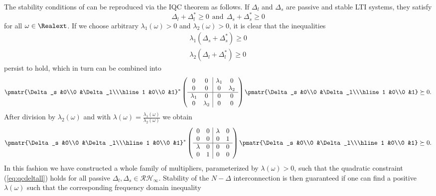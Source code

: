 The stability conditions of  can be reproduced via the IQC theorem as follows. If $\Delta_l$ and $\Delta_s$ are passive and stable LTI systems, they satisfy
\[
\Delta_l + \Delta_l^* \geq 0 \ \ \text{and}\ \
\Delta_s + \Delta_s^* \geq 0
\]
for all $\omega\in\Realext$. If we choose arbitrary $\lambda_1(\omega)>0$ and $\lambda_2(\omega)>0$, it is clear that
the inequalities
\begin{align*}
\lambda_1(\Delta_s + \Delta_s^*) \geq 0 \\
\lambda_2(\Delta_l + \Delta_l^*) \geq 0
\end{align*}
persist to hold, which in turn can be combined into
\[%
\pmatr{\Delta_s &0\\0 &\Delta_l\\\hline 1 &0\\0 &1}^*\left(\begin{array}{cc|cc}
      0&0  &\lambda_1 &0 \\
      0&0  &0         &\lambda_2\\ \hline
      \lambda_1 &0 &0 &0\\
      0 &\lambda_2 &0 &0
\end{array}\right)
\pmatr{\Delta_s &0\\0 &\Delta_l\\\hline 1 &0\\0 &1}
\succeq 0.
\]
After division by $\lambda_2(\omega)$ and with
$\lambda(\omega)=\frac{\lambda_1(\omega)}{\lambda_2(\omega)}$ we
obtain
\begin{equation}
\pmatr{\Delta_s &0\\0 &\Delta_l\\\hline 1 &0\\0 &1}^*\left(\begin{array}{cc|cc}
      0&0  &\lambda &0 \\
      0&0  &0         &1\\ \hline
      \lambda &0 &0 &0\\
      0 &1 &0 &0
\end{array}\right)
\pmatr{\Delta_s &0\\0 &\Delta_l\\\hline 1 &0\\0 &1} \succeq 0.
\label{eq:qcdeltall}
\end{equation}
In this fashion we have constructed a whole family of multipliers, parameterized by $\lambda(\omega)>0$, such that the quadratic constraint (\ref{eq:qcdeltall}) holds for all passive $\Delta_l,\Delta_s\in\mathcal{RH}_\infty$. Stability of the $N-\Delta$ interconnection is then guaranteed if one can find a positive $\lambda(\omega)$ such that the corresponding frequency domain inequality
